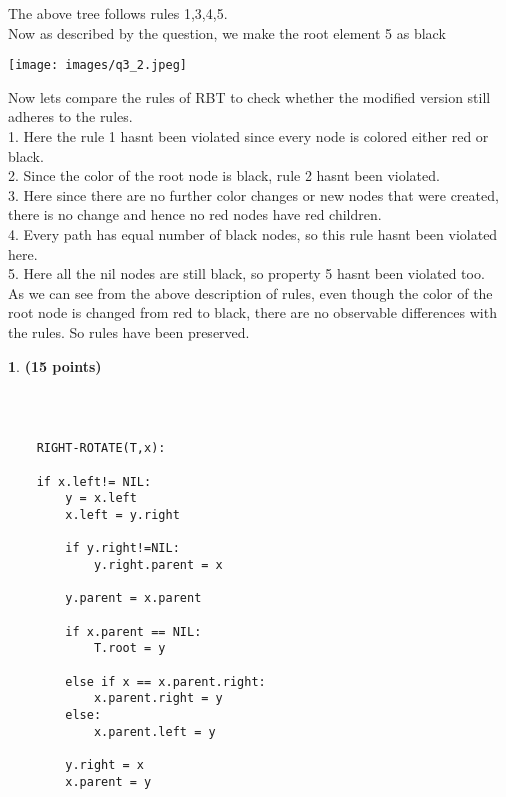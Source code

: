 \documentclass[11pt]{article}
\theoremstyle{definition}
\newtheorem{prob}{}
\newcommand{\solution}{\medskip\noindent{\color{DarkBlue}\textbf{Solution:}}}
\begin{document}
The above tree follows rules 1,3,4,5. \\

Now as described by the question, we make the root element 5 as black

\texttt{[image: images/q3\_2.jpeg]}

Now lets compare the rules of RBT to check whether the modified version still adheres to the rules. \\

1. Here the rule 1 hasnt been violated since every node is colored either red or black. \\

2. Since the color of the root node is black, rule 2 hasnt been violated. \\

3. Here since there are no further color changes or new nodes that were created, there is no change and hence no red nodes have red children. \\

4. Every path has equal number of black nodes, so this rule hasnt been violated here. \\

5. Here all the nil nodes are still black, so property 5 hasnt been violated too. \\

As we can see from the above description of rules, even though the color of the root node is changed from red to black, there are no observable
differences with the rules. So rules have been preserved.

\begin{prob} \textbf{(15 points)}
\end{prob}

\solution \\

\begin{verbatim}
    
    RIGHT-ROTATE(T,x):

    if x.left!= NIL:
        y = x.left
        x.left = y.right

        if y.right!=NIL:
            y.right.parent = x
        
        y.parent = x.parent

        if x.parent == NIL:
            T.root = y
        
        else if x == x.parent.right:
            x.parent.right = y
        else:
            x.parent.left = y
        
        y.right = x
        x.parent = y
\end{verbatim}
\end{document}

